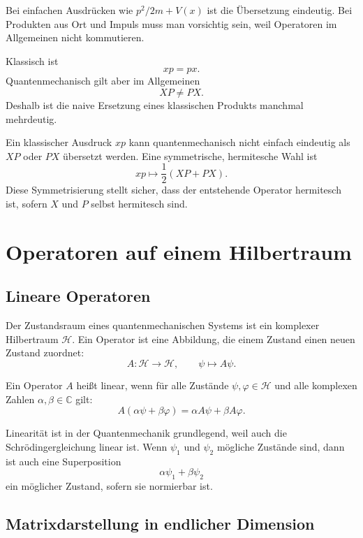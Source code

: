 Bei einfachen Ausdrücken wie $p^2/2m+V(x)$ ist die Übersetzung eindeutig. Bei Produkten aus Ort und Impuls muss man vorsichtig sein, weil Operatoren im Allgemeinen nicht kommutieren.

Klassisch ist
\[
    xp=px.
\]
Quantenmechanisch gilt aber im Allgemeinen
\[
    XP\ne PX.
\]
Deshalb ist die naive Ersetzung eines klassischen Produkts manchmal mehrdeutig.

\begin{examplebox}
Ein klassischer Ausdruck $xp$ kann quantenmechanisch nicht einfach eindeutig als $XP$ oder $PX$ übersetzt werden. Eine symmetrische, hermitesche Wahl ist
\[
    xp \longmapsto \frac{1}{2}(XP+PX).
\]
Diese Symmetrisierung stellt sicher, dass der entstehende Operator hermitesch ist, sofern $X$ und $P$ selbst hermitesch sind.
\end{examplebox}

\section{Operatoren auf einem Hilbertraum}

\subsection{Lineare Operatoren}

Der Zustandsraum eines quantenmechanischen Systems ist ein komplexer Hilbertraum $\mathcal H$. Ein Operator ist eine Abbildung, die einem Zustand einen neuen Zustand zuordnet:
\[
    A:\mathcal H\to\mathcal H,
    \qquad
    \psi\mapsto A\psi.
\]

\begin{definitionbox}
Ein Operator $A$ heißt linear, wenn für alle Zustände $\psi,\varphi\in\mathcal H$ und alle komplexen Zahlen $\alpha,\beta\in\mathbb C$ gilt:
\[
    A(\alpha\psi+\beta\varphi)
    =\alpha A\psi+\beta A\varphi.
\]
\end{definitionbox}

Linearität ist in der Quantenmechanik grundlegend, weil auch die Schrödingergleichung linear ist. Wenn $\psi_1$ und $\psi_2$ mögliche Zustände sind, dann ist auch eine Superposition
\[
    \alpha\psi_1+\beta\psi_2
\]
ein möglicher Zustand, sofern sie normierbar ist.

\subsection{Matrixdarstellung in endlicher Dimension}

